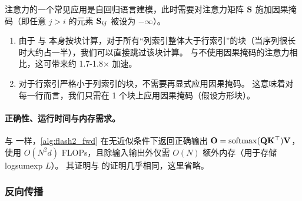 注意力的一个常见应用是自回归语言建模，此时需要对注意力矩阵 $\mathbf{S}$ 施加因果掩码（即任意 $j>i$ 的元素 $\mathbf{S}_{ij}$ 被设为 $-\infty$）。
\begin{enumerate}
  \item 由于 \sysnameone 与 \sysname 本身按块计算，对于所有“列索引整体大于行索引”的块（当序列很长时大约占一半），我们可以直接跳过该块计算。
  与不使用因果掩码的注意力相比，这可带来约 1.7-1.8$\times$ 加速。
  \item 对于行索引严格小于列索引的块，不需要再显式应用因果掩码。
  这意味着对每一行而言，我们只需在 1 个块上应用因果掩码（假设方形块）。
\end{enumerate}

\paragraph{正确性、运行时间与内存需求。}
与 \sysnameone 一样，\cref{alg:flash2_fwd} 在无近似条件下返回正确输出
$\mathbf{O} = \mathrm{softmax}(\mathbf{Q}\mathbf{K}^\top)\mathbf{V}$，使用 $O(N^2d)$ FLOPs，且除输入输出外仅需 $O(N)$ 额外内存（用于存储 logsumexp $L$）。
其证明与 \citet[Theorem 1]{dao2022flashattention} 的证明几乎相同，这里省略。

\subsubsection{反向传播}

